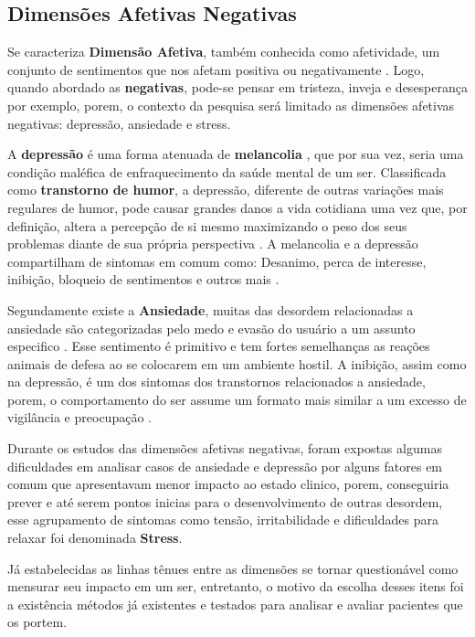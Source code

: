 \subsection{Dimensões Afetivas Negativas}
Se caracteriza \textbf{Dimensão Afetiva}, também conhecida como afetividade, um conjunto de sentimentos que nos afetam positiva ou negativamente \cite{pinto2009afetos}. Logo, quando abordado as \textbf{negativas}, pode-se pensar em tristeza, inveja e desesperança por exemplo, porem, o contexto da pesquisa será limitado as dimensões afetivas negativas: depressão, ansiedade e stress.

A \textbf{depressão} é uma forma atenuada de \textbf{melancolia} \cite{roudinesco2000psicanalise}, que por sua vez, seria uma condição maléfica de enfraquecimento da saúde mental de um ser. Classificada como \textbf{transtorno de humor}, a depressão, diferente de outras variações mais regulares de humor, pode causar grandes danos a vida cotidiana uma vez que, por definição, altera a percepção de si mesmo maximizando o peso dos seus problemas diante de sua própria perspectiva \cite{esteves2006depressao}. A melancolia e a depressão compartilham de sintomas em comum como: Desanimo, perca de interesse, inibição, bloqueio de sentimentos e outros mais \cite[28]{freud2014livro}.

Segundamente existe a \textbf{Ansiedade}, muitas das desordem relacionadas a ansiedade são categorizadas pelo medo e evasão do usuário a um assunto especifico \cite[393]{dsmiv}. Esse sentimento é primitivo e tem fortes semelhanças as reações animais de defesa ao se colocarem em um ambiente hostil. A inibição, assim como na depressão, é um dos sintomas dos transtornos relacionados a ansiedade, porem, o comportamento do ser assume um formato mais similar a um excesso de vigilância e preocupação \cite{margis2003relaccao}.

Durante os estudos das dimensões afetivas negativas, foram expostas algumas dificuldades em analisar casos de ansiedade e depressão por alguns fatores em comum que apresentavam menor impacto ao estado clinico, porem, conseguiria prever e até serem pontos inicias para o desenvolvimento de outras desordem, esse agrupamento de sintomas como tensão, irritabilidade e dificuldades para relaxar foi denominada \textbf{Stress}. \cite{lovibond1995structure, ribeiro2004contribuiccao, margis2003relaccao}

Já estabelecidas as linhas tênues entre as dimensões se tornar questionável como mensurar seu impacto em um ser, entretanto, o motivo da escolha desses itens foi a existência métodos já existentes e testados para analisar e avaliar pacientes que os portem.
